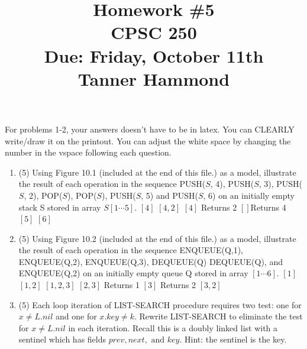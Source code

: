 \documentclass[12pt]{article}
\begin{document}

\title{Homework \#5 \\ CPSC 250 \\ Due: Friday, October 11th \\ Tanner Hammond}%
\date{}

\maketitle

For problems 1-2, your answers doesn't have to be in latex. You can CLEARLY write/draw it on 
the printout. You can adjust the white space by changing the number in the vspace following each
question.

\begin{enumerate}
\item (5) Using Figure 10.1 (included at the end of this file.) as a model, illustrate the 
result of each operation in the sequence
PUSH($S$, 4), PUSH($S$, 3), PUSH($S$, 2), POP($S$), POP($S$), PUSH($S$, 5) and PUSH($S$, 6) on 
an initially empty stack S stored in array $S[1 \cdots 5]$. \vspace{50px}
\newline
$[4]$ \newline
$[4,2]$ \newline
$[4]$ Returns 2 \newline
$[] $Returns 4 \newline
$[5]$\newline
$[6]$

\item (5) Using Figure 10.2 (included at the end of this file.) as a model, illustrate the 
result of each operation in the sequence ENQUEUE(Q,1), ENQUEUE(Q,2), ENQUEUE(Q,3), DEQUEUE(Q)
DEQUEUE(Q), and ENQUEUE(Q,2) on an initially empty queue Q stored in
array $[1 \cdots 6]$. \vspace{50px}\newline
$[1]$ \newline
$[1,2]$ \newline
$[1,2,3]$ \newline
$[2,3]$ Returns 1 \newline
$[3]$ Returns 2 \newline
$[3,2]$

\item (5) Each loop iteration of LIST-SEARCH procedure requires two test: one for $x \neq L.nil$
and one for $x.key \neq k$. Rewrite LIST-SEARCH to eliminate the test for $x \neq L.nil$ in
each iteration. Recall this is a doubly linked list with a sentinel which has fields
$prev, next, \textrm{ and } key$. Hint: the sentinel is the key.


\end{enumerate}
\end{document}
